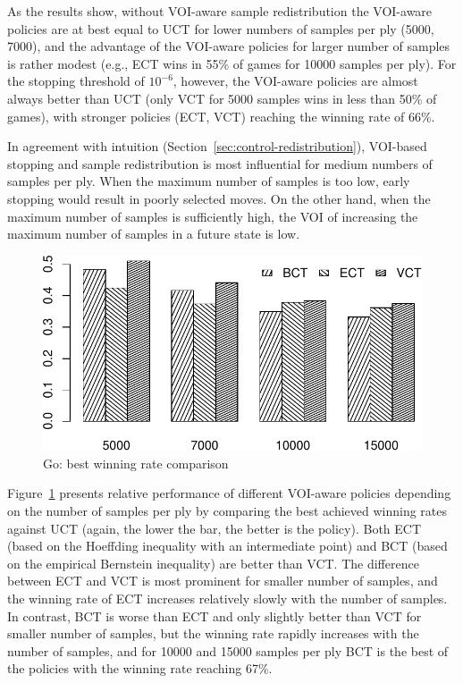 \documentclass{article}
\begin{document}
As the results show, without VOI-aware sample redistribution the
VOI-aware policies are at best equal to UCT for lower numbers of
samples per ply (5000, 7000), and the advantage of the VOI-aware policies
for larger number of samples is rather modest (e.g., ECT wins in 55\%
of games for 10000 samples per ply). For the stopping threshold of
$10^{-6}$, however, the VOI-aware policies are almost always better
than UCT (only VCT for 5000 samples wins in less than 50\% of games),
with stronger policies (ECT, VCT) reaching the winning rate of 66\%.

In agreement with intuition
(Section~\ref{sec:control-redistribution}), VOI-based stopping and
sample redistribution is most influential for medium numbers of
samples per ply. When the maximum number of samples is too low, early
stopping would result in poorly selected moves. On the other hand,
when the maximum number of samples is sufficiently high, the VOI of
increasing the maximum number of samples in a future state is low.

\begin{figure}[t]
\centering
\includegraphics[scale=0.8]{bests-bw.pdf}
\caption{Go: best winning rate comparison}
\label{fig:best-winning-rate}
\end{figure}
Figure~\ref{fig:best-winning-rate} presents relative performance of
different VOI-aware policies depending on the number of samples per
ply by comparing the best achieved winning rates against UCT (again,
the lower the bar, the better is the policy). Both ECT (based on the
Hoeffding inequality with an intermediate point) and BCT (based on the empirical
Bernstein inequality) are better than VCT. The difference between ECT
and VCT is most prominent for smaller number of samples, and the
winning rate of ECT increases relatively slowly with the number of
samples. In contrast, BCT is worse than ECT and only slightly better
than VCT for smaller number of samples, but the winning rate rapidly
increases with the number of samples, and for 10000 and 15000 samples
per ply BCT is the best of the policies with the winning rate reaching
67\%.
\end{document}
